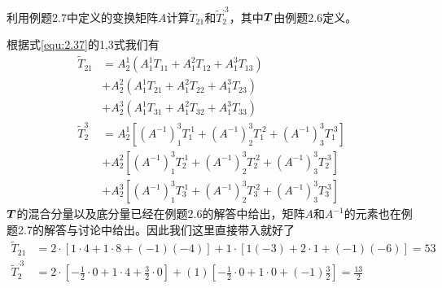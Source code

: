\begin{example}
    利用例题2.7中定义的变换矩阵$A$计算$\widetilde{T}_{21}$和$\widetilde{T}_{2}^{\cdot 3}$，其中$\boldsymbol{T}$由例题2.6定义。
\end{example}
\begin{solution}
根据式\eqref{equ:2.37}的1,3式我们有
\begin{align*}
	\widetilde{T}_{21}&=A_{2}^{1}\left( A_{1}^{1}T_{11}+A_{1}^{2}T_{12}+A_{1}^{3}T_{13} \right)\\
	&+A_{2}^{2}\left( A_{1}^{1}T_{21}+A_{1}^{2}T_{22}+A_{1}^{3}T_{23} \right)\\
	&+A_{2}^{3}\left( A_{1}^{1}T_{31}+A_{1}^{2}T_{32}+A_{1}^{3}T_{33} \right)\\
	\widetilde{T}_{2}^{3}&=A_{2}^{1}\left[ \left( A^{-1} \right) _{1}^{3}T_{1}^{\cdot 1}+\left( A^{-1} \right) _{2}^{3}T_{1}^{\cdot 2}+\left( A^{-1} \right) _{3}^{3}T_{1}^{\cdot 3} \right]\\
	&+A_{2}^{2}\left[ \left( A^{-1} \right) _{1}^{3}T_{2}^{\cdot 1}+\left( A^{-1} \right) _{2}^{3}T_{2}^{\cdot 2}+\left( A^{-1} \right) _{3}^{3}T_{2}^{\cdot 3} \right]\\
	&+A_{2}^{3}\left[ \left( A^{-1} \right) _{1}^{3}T_{3}^{\cdot 1}+\left( A^{-1} \right) _{2}^{3}T_{3}^{\cdot 2}+\left( A^{-1} \right) _{3}^{3}T_{3}^{\cdot 3} \right]
\end{align*}
$\boldsymbol{T}$的混合分量以及底分量已经在例题2.6的解答中给出，矩阵$A$和$A^{-1}$的元素也在例题2.7的解答与讨论中给出。因此我们这里直接带入就好了
\begin{align*}
	\widetilde{T}_{21}&=2\cdot [1\cdot 4+1\cdot 8+(-1)(-4)]+1\cdot [1(-3)+2\cdot 1+(-1)(-6)]=53\\
	\widetilde{T}_{2}^{\cdot 3}&=2\cdot \left[ -\frac{1}{2}\cdot 0+1\cdot 4+\frac{3}{2}\cdot 0 \right] +(1)\left[ -\frac{1}{2}\cdot 0+1\cdot 0+(-1)\frac{3}{2} \right] =\frac{13}{2}
\end{align*}
\end{solution}